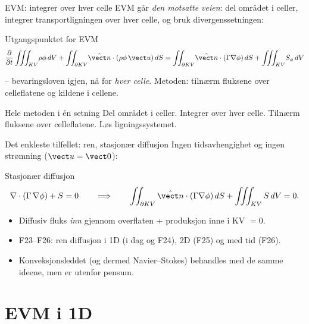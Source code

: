 \documentclass[11pt,aspectratio=169]{beamer}
\begin{document}
\begin{frame}{EVM: integrer over hver celle}
EVM går \emph{den motsatte veien}: del området i celler, integrer transportligningen over hver celle, og bruk divergenssetningen:
\begin{oppsumb}{Utgangspunktet for EVM}
\[
\frac{\partial}{\partial t}\iiint_{KV}\!\rho\phi\,dV + \iint_{\partial KV}\!\hat{\vect n}\cdot(\rho\phi\,\vect u)\,dS
= \iint_{\partial KV}\!\hat{\vect n}\cdot(\Gamma\nabla\phi)\,dS + \iiint_{KV}\!S_\phi\,dV
\]
\end{oppsumb}
-- bevaringsloven igjen, nå for \emph{hver celle}. Metoden: tilnærm fluksene over celleflatene og kildene i cellene.
\begin{remb}{Hele metoden i én setning}
Del området i celler. Integrer over hver celle. Tilnærm fluksene over celleflatene. Løs ligningssystemet.
\end{remb}
\end{frame}

\begin{frame}{Det enkleste tilfellet: ren, stasjonær diffusjon}
Ingen tidsavhengighet og ingen strømning ($\vect u=\vect 0$):
\begin{oppsumb}{Stasjonær diffusjon}
\[
\nabla\cdot(\Gamma\,\nabla\phi) + S = 0
\qquad\Longrightarrow\qquad
\iint_{\partial KV}\hat{\vect n}\cdot(\Gamma\nabla\phi)\,dS + \iiint_{KV} S\,dV = 0 .
\]
\end{oppsumb}
\begin{itemize}
\item Diffusiv fluks \emph{inn} gjennom overflaten + produksjon inne i KV $=0$.
\item F23--F26: ren diffusjon i 1D (i dag og F24), 2D (F25) og med tid (F26).
\item Konveksjonsleddet (og dermed Navier--Stokes) behandles med de samme ideene, men er utenfor pensum.
\end{itemize}
\end{frame}

\section{EVM i 1D}
\end{document}
